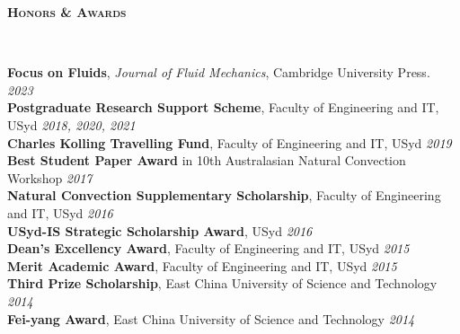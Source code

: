 \documentclass[letterpaper, 10pt]{article}
\newenvironment{changemargin}[2]{%
  \begin{list}{}{%
      \setlength{\topsep}{0pt}%
      \setlength{\leftmargin}{#1}%
      \setlength{\rightmargin}{#2}%
      \setlength{\listparindent}{\parindent}%
      \setlength{\itemindent}{\parindent}%
      \setlength{\parsep}{\parskip}%
    }%
  \item[]}{\end{list}
}
\newcommand{\lineover}{
  \begin{changemargin}{-0.05in}{-0.05in}
    \vspace*{-8pt}
    \hrulefill \\
    \vspace*{-2pt}
  \end{changemargin}
}
\newcommand{\header}[1]{
  \begin{changemargin}{-0.5in}{-0.5in}
    \textbf{\scshape{#1}}\\
    \lineover
  \end{changemargin}
}
\newenvironment{body} {
  \vspace*{-16pt}
  \begin{changemargin}{-0.25in}{-0.5in}
  }
  {\end{changemargin}
}
\begin{document}
\header{Honors \& Awards}
\begin{body}
	\vspace{14pt}
	\textbf{Focus on Fluids}, {\em Journal of Fluid Mechanics}, Cambridge University Press. \hfill {\em 2023} \\ \smallskip
	\textbf{Postgraduate Research Support Scheme}, Faculty of Engineering and IT, USyd\hfill
	\emph{2018, 2020, 2021}\\ \smallskip
	\textbf{Charles Kolling Travelling Fund}, Faculty of Engineering and IT, USyd\hfill
	\emph{2019}\\ \smallskip
	\textbf{Best Student Paper Award}
	in 10th Australasian Natural Convection Workshop
	\hfill \emph{2017}\\ \smallskip
	\textbf{Natural Convection Supplementary Scholarship}, Faculty of Engineering and IT, USyd \hfill
	\emph{2016}\\ \smallskip
	\textbf{USyd-IS Strategic Scholarship Award}, 
	USyd \hfill \emph{2016}\\
	\smallskip
	\textbf{Dean's Excellency Award}, Faculty of Engineering and IT, USyd \hfill \emph{2015}\\
	\textbf{Merit Academic Award}, Faculty of Engineering and IT, USyd \hfill \emph{2015}\\
	\textbf{Third Prize Scholarship}, East China University of Science and Technology \hfill \emph{2014}\\
	\textbf{Fei-yang Award}, East China University of Science and Technology \hfill \emph{2014}\\
	
	
\end{body}
\smallskip
%	
\end{document}
